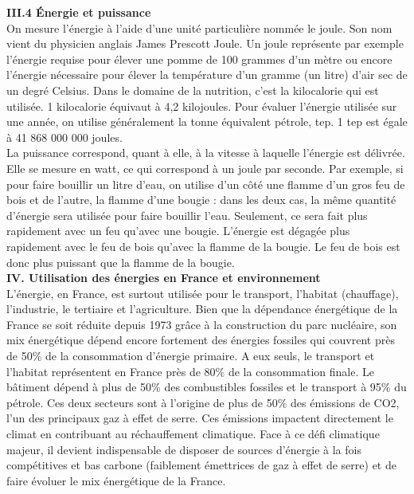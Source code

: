 \documentclass[8pt]{article}
\begin{document}
\textbf{III.4 Énergie et puissance}\\

On mesure l’énergie à l’aide d’une unité particulière nommée le joule. Son nom vient du physicien anglais James Prescott Joule. Un joule représente par exemple l'énergie requise pour élever une pomme de 100 grammes d'un mètre ou encore l'énergie nécessaire pour élever la température d'un gramme (un litre) d'air sec de un degré Celsius.
Dans le domaine de la nutrition, c’est la kilocalorie qui est utilisée. 1 kilocalorie équivaut à 4,2 kilojoules. Pour évaluer l’énergie utilisée sur une année, on utilise généralement la tonne équivalent pétrole, tep. 1 tep est égale à 41 868 000 000 joules.\\ 

La puissance correspond, quant à elle, à la vitesse à laquelle l'énergie est délivrée. Elle se mesure en watt, ce qui correspond à un joule par seconde. 
Par exemple, si pour faire bouillir un litre d’eau, on utilise d’un côté une flamme d’un gros feu de bois et de l’autre, la flamme d’une bougie : dans les deux cas, la même quantité d’énergie sera utilisée pour faire bouillir l’eau. Seulement, ce sera fait plus rapidement avec un feu qu’avec une bougie. L'énergie est dégagée plus rapidement avec le feu de bois qu'avec la flamme de la bougie. Le feu de bois est donc plus puissant que la flamme de la bougie. \\

\textbf{IV. Utilisation des énergies en France et environnement}\\

L’énergie, en France, est surtout utilisée pour le transport, l’habitat (chauffage), l’industrie, le tertiaire et l’agriculture.
Bien que la dépendance énergétique de la France se soit réduite depuis 1973 grâce à la construction du parc nucléaire, son mix énergétique dépend encore fortement des énergies fossiles qui couvrent près de 50\% de la consommation d’énergie primaire. A eux seuls, le transport et l’habitat représentent en France près de 80\% de la consommation finale. Le bâtiment dépend à plus de 50\% des combustibles fossiles et le transport à 95\% du pétrole. Ces deux secteurs sont à l’origine de plus de 50\% des émissions de CO2, l’un des principaux gaz à effet de serre. 
Ces émissions impactent directement le climat en contribuant au réchauffement climatique. Face à ce défi climatique majeur, il devient indispensable de disposer de sources d’énergie à la fois compétitives et bas carbone (faiblement émettrices de gaz à effet de serre) et de faire évoluer le mix énergétique de la France. \\
\end{document}
